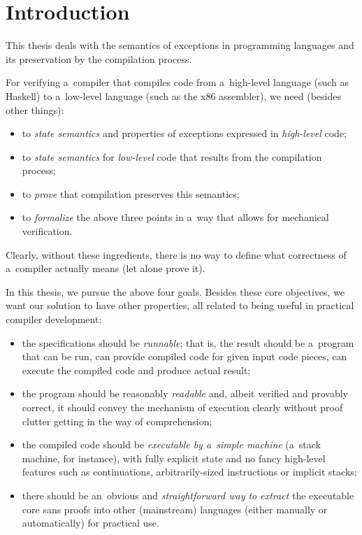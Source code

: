 \chapter*{Introduction}


This thesis deals with the semantics of exceptions in programming languages and its preservation
by the compilation process.

For verifying a~compiler that compiles code from a~high-level language (such as Haskell)
to a~low-level language (such as the x86 assembler), we need (besides other things):
\begin{itemize}
	\item to \emph{state semantics} and properties of exceptions expressed in \emph{high-level} code;
	\item to \emph{state semantics} for \emph{low-level} code that results from the compilation process;
	\item to \emph{prove} that compilation preserves this semantics;
	\item to \emph{formalize} the above three points in a~way that allows for mechanical verification.
\end{itemize}
Clearly, without these ingredients, there is no way to define what correctness of a~compiler actually
means (let alone prove it).

In this thesis, we pursue the above four goals.
Besides these core objectives, we want our solution to have other properties, all related
to being useful in practical compiler development:

\begin{itemize}\label{objectives}

	\item the specifications should be \emph{runnable}; that is, the result should be a~program
		that can be run, can provide compiled code for given input code pieces, can execute
		the compiled code and produce actual result;
		
	\item the program should be reasonably \emph{readable} and, albeit verified and provably
		correct, it should convey the mechanism of execution clearly without proof clutter getting
		in the way of comprehension;
		
	\item the compiled code should be \emph{executable by a~simple machine} (a~stack machine,
		for instance), with fully explicit state and no fancy high-level features such as
		continuations, arbitrarily-sized instructions or implicit stacks;
		
	\item there should be an~obvious and \emph{straightforward way to extract} the executable core
		sans proofs into other (mainstream) languages (either manually or automatically)
		for practical use.
		
\end{itemize}

